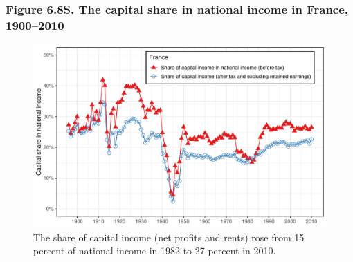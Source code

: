 \documentclass[t]{beamer}\usepackage[]{graphicx}\usepackage[]{color}
\newenvironment{knitrout}{}{} %
\begin{document}
\begin{frame}[label=Figure_6_8S]
\frametitle{Figure 6.8S. The capital share in national income in France, 1900--2010}
\begin{figure}[t]
\begin{minipage}[b]{\textwidth}
\centering
\begin{knitrout}\footnotesize
{}\color{fgcolor}

{\centering \includegraphics[width=1\linewidth]{figures/color/Figure_6_8S} 

}



\end{knitrout}
\caption{The share of capital income (net profits and rents) rose from 15 percent of national income in 1982 to 27 percent in 2010.}
\end{minipage}
\end{figure}
\end{frame}
\end{document}
